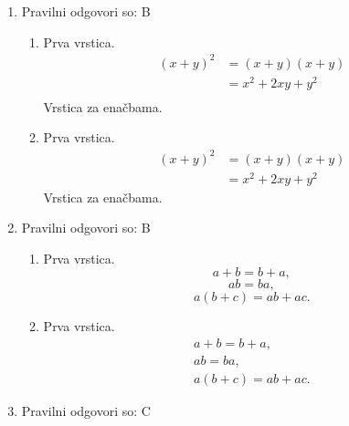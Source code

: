 \documentclass[11pt]{article}
\begin{document}
\begin{enumerate}
    \item Pravilni odgovori so: B %
    \begin{enumerate}
        \item Prva vrstica.
\begin{align*}
  (x + y)^2 &= (x + y)(x + y) \\
  &= x^2 + 2 x y + y^2 \\
\end{align*}
        Vrstica za enačbama.
        \item Prva vrstica.
\begin{align*}
  (x + y)^2 &= (x + y)(x + y) \\
  &= x^2 + 2 x y + y^2
\end{align*}
        Vrstica za enačbama.
    \end{enumerate}

    \item Pravilni odgovori so: B %
    \begin{enumerate}
        \item Prva vrstica.
\[ a + b = b + a, \]
\[ a b = b a, \]
\[ a (b + c) = a b + a c. \]
        \item Prva vrstica.
\begin{gather*}
  a + b = b + a, \\
  a b = b a, \\
  a (b + c) = a b + a c.
\end{gather*}
    \end{enumerate}

    \item Pravilni odgovori so: C %

\end{enumerate}
\end{document}

